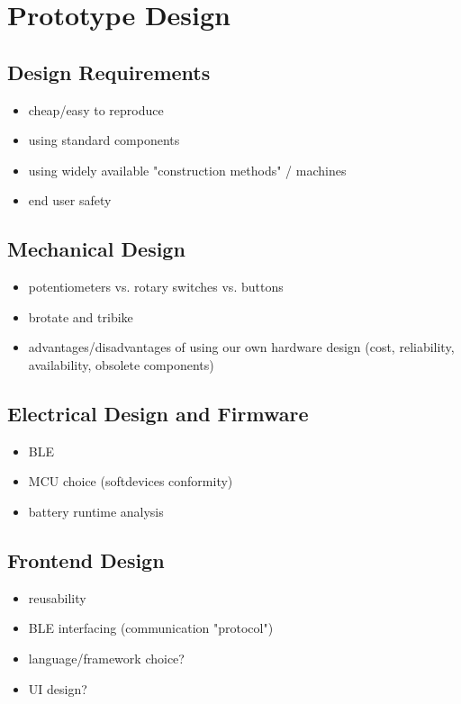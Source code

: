 \section{Prototype Design}\label{sec:prototype_design}

\subsection{Design Requirements}

\begin{itemize}
    \item cheap/easy to reproduce
    \item using standard components
    \item using widely available "construction methods" / machines
    \item end user safety \cite{gesturing_on_the_handlebars} \cite{no_need_to_stop} \cite{text_me_if_you_can} \cite{brotate_and_tribike}
\end{itemize}

\subsection{Mechanical Design}

\begin{itemize}
    \item potentiometers vs. rotary switches vs. buttons
    \item brotate and tribike \cite{brotate_and_tribike}
    \item advantages/disadvantages of using our own hardware design (cost, reliability, availability, obsolete components)
\end{itemize}

\subsection{Electrical Design and Firmware}

\begin{itemize}
    \item BLE
    \item MCU choice (softdevices conformity)
    \item battery runtime analysis
\end{itemize}

\subsection{Frontend Design}

\begin{itemize}
    \item reusability
    \item BLE interfacing (communication "protocol")
    \item language/framework choice?
    \item UI design?
\end{itemize}
